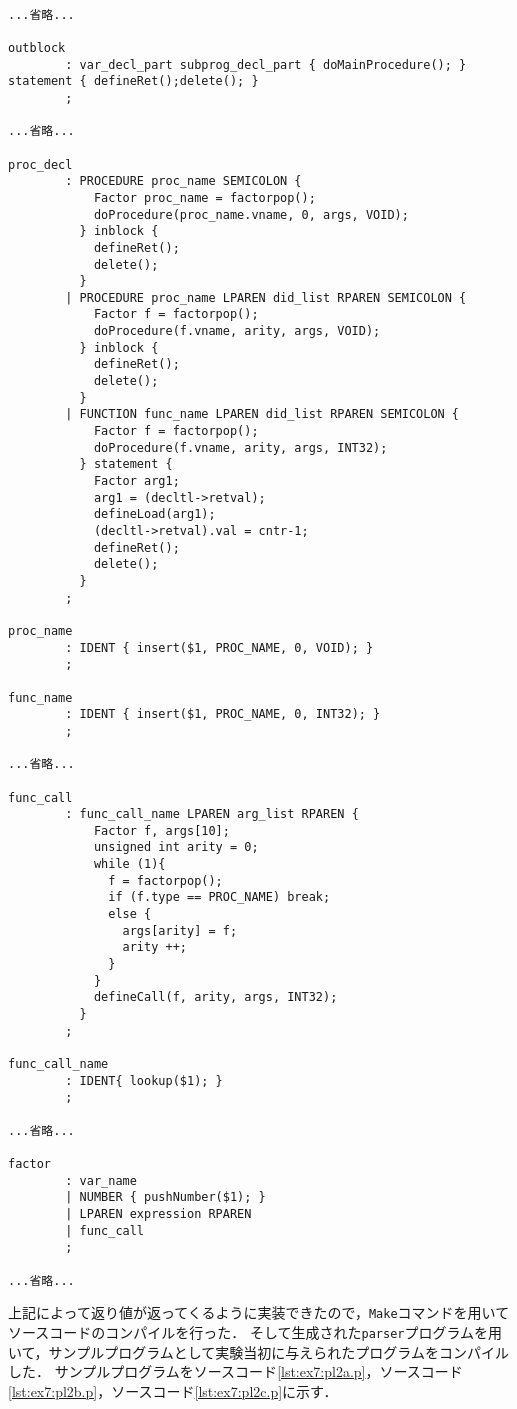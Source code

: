 \documentclass[uplatex]{jsarticle}
\begin{document}
\begin{lstlisting}[caption=構文規則部の処理,label=lst:ex7:parser.y:rules]

...省略...

outblock
        : var_decl_part subprog_decl_part { doMainProcedure(); } statement { defineRet();delete(); }
        ;

...省略...

proc_decl
        : PROCEDURE proc_name SEMICOLON {
            Factor proc_name = factorpop();
            doProcedure(proc_name.vname, 0, args, VOID);
          } inblock {
            defineRet();
            delete();
          }
        | PROCEDURE proc_name LPAREN did_list RPAREN SEMICOLON {
            Factor f = factorpop();
            doProcedure(f.vname, arity, args, VOID);
          } inblock {
            defineRet();
            delete();
          }
        | FUNCTION func_name LPAREN did_list RPAREN SEMICOLON {
            Factor f = factorpop();
            doProcedure(f.vname, arity, args, INT32);
          } statement {
            Factor arg1;
            arg1 = (decltl->retval);
            defineLoad(arg1);
            (decltl->retval).val = cntr-1;
            defineRet();
            delete();
          }
        ;

proc_name
        : IDENT { insert($1, PROC_NAME, 0, VOID); }
        ;

func_name
        : IDENT { insert($1, PROC_NAME, 0, INT32); }
        ;

...省略...

func_call
        : func_call_name LPAREN arg_list RPAREN {
            Factor f, args[10];
            unsigned int arity = 0;
            while (1){
              f = factorpop();
              if (f.type == PROC_NAME) break;
              else {
                args[arity] = f;
                arity ++;
              }
            }
            defineCall(f, arity, args, INT32);
          }
        ;

func_call_name
        : IDENT{ lookup($1); }
        ;

...省略...

factor
        : var_name
        | NUMBER { pushNumber($1); }
        | LPAREN expression RPAREN
        | func_call
        ;

...省略...

\end{lstlisting}

上記によって返り値が返ってくるように実装できたので，\verb#Make#コマンドを用いてソースコードのコンパイルを行った．
そして生成された\verb#parser#プログラムを用いて，サンプルプログラムとして実験当初に与えられたプログラムをコンパイルした．
サンプルプログラムをソースコード\ref{lst:ex7:pl2a.p}，ソースコード\ref{lst:ex7:pl2b.p}，ソースコード\ref{lst:ex7:pl2c.p}に示す．
\end{document}
